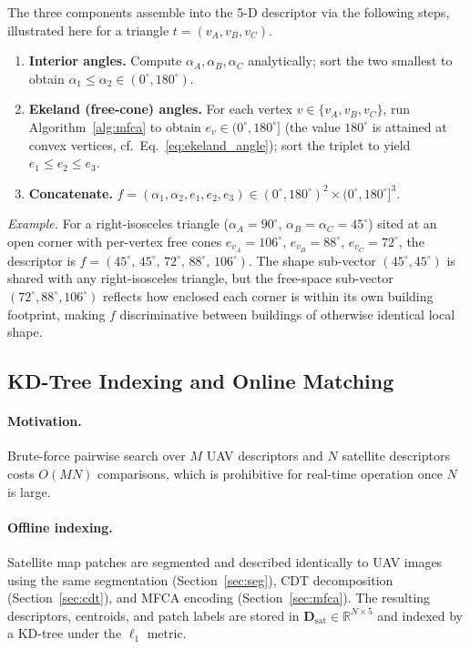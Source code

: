 \documentclass[10pt]{article}
\theoremstyle{plain}
\theoremstyle{definition}
\begin{document}
The three components assemble into the 5-D descriptor via the following
steps, illustrated here for a triangle $t = (v_A, v_B, v_C)$.
\begin{enumerate}[label=\textbf{Step \arabic*.},leftmargin=*,topsep=3pt]
\item \textbf{Interior angles.}
  Compute $\alpha_A, \alpha_B, \alpha_C$ analytically; sort the two smallest
  to obtain $\alpha_1 \le \alpha_2 \in (0^\circ, 180^\circ)$.
\item \textbf{Ekeland (free-cone) angles.}
  For each vertex $v \in \{v_A, v_B, v_C\}$, run
  Algorithm~\ref{alg:mfca} to obtain $e_v \in (0^\circ, 180^\circ]$ (the value
  $180^\circ$ is attained at convex vertices, cf.\ Eq.~\eqref{eq:ekeland_angle});
  sort the triplet to yield $e_1 \le e_2 \le e_3$.
\item \textbf{Concatenate.}
  $f = (\alpha_1, \alpha_2, e_1, e_2, e_3) \in
  (0^\circ, 180^\circ)^2\times(0^\circ, 180^\circ]^3$.
\end{enumerate}

\noindent\textit{Example.}
For a right-isosceles triangle ($\alpha_A = 90^\circ$, $\alpha_B = \alpha_C =
45^\circ$) sited at an open corner with per-vertex free cones
$e_{v_A} = 106^\circ$, $e_{v_B} = 88^\circ$, $e_{v_C} = 72^\circ$,
the descriptor is $f = (45^\circ,\, 45^\circ,\, 72^\circ,\, 88^\circ,\,
106^\circ)$.
The shape sub-vector $(45^\circ, 45^\circ)$ is shared with any right-isosceles
triangle, but the free-space sub-vector $(72^\circ, 88^\circ, 106^\circ)$
reflects how enclosed each corner is within its own building footprint, making
$f$ discriminative between buildings of otherwise identical local shape.


\subsection{KD-Tree Indexing and Online Matching}
\label{sec:kdtree}

\paragraph{Motivation.}
Brute-force pairwise search over $M$ UAV descriptors and $N$ satellite
descriptors costs $O(MN)$ comparisons, which is prohibitive for real-time
operation once $N$ is large.

\paragraph{Offline indexing.}
Satellite map patches are segmented and described identically to UAV images
using the same segmentation (Section~\ref{sec:seg}), CDT decomposition
(Section~\ref{sec:cdt}), and MFCA encoding (Section~\ref{sec:mfca}).
The resulting descriptors, centroids, and patch labels are stored in
$\mathbf{D}_{\mathrm{sat}} \in \mathbb{R}^{N \times 5}$ and indexed by a
KD-tree under the $\ell_1$ metric.
\end{document}
